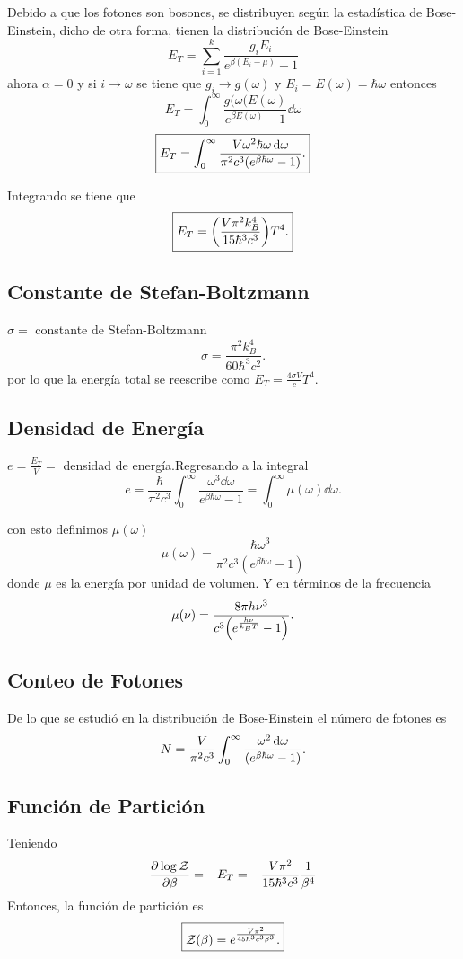 Debido a que los fotones son bosones, se distribuyen según la estadística de Bose-Einstein, dicho de otra forma, tienen la distribución de Bose-Einstein
	$$ E_T = \sum _{i=1} ^k \frac{g_i E_i}{e^{\beta (E_i - \mu)} - 1} $$
ahora $\alpha = 0$ y si $i \to \omega$ se tiene que $g_i \to g(\omega)$ y $E_i = E(\omega) = \hbar \omega$ entonces
	$$ E_T = \int _0 ^\infty \frac{g(\omega( E(\omega)}{e^{\beta E(\omega)} - 1} \dd{\omega} $$
	$$ \boxed{ E_T = \int _0 ^\infty \frac{V \omega ^2 \hbar \omega \dd{\omega}}{\pi ^2 c^3 \qty(e^{\beta \hbar \omega} - 1)}. } $$
	
Integrando se tiene que
	$$ \boxed{ E_T = \qty(\frac{V\pi^2 k_B ^4}{15 \hbar ^3 c^3}) T^4. } $$


\subsection{Constante de Stefan-Boltzmann}
$\sigma = $ constante de Stefan-Boltzmann
	$$ \sigma = \frac{\pi ^2 k_B ^4}{60 \hbar ^3 c^2}. $$
por lo que la energía total se reescribe como $E_T = \frac{4\sigma V}{c} T^4$.

\subsection{Densidad de Energía}
$e = \frac{E_T}{V} = $ densidad de energía.Regresando a la integral
	$$ e = \frac{\hbar}{\pi^2 c^3} \int _0 ^\infty \frac{\omega ^3 \dd{\omega}}{e^{\beta \hbar \omega} - 1} = \int _0 ^\infty \mu (\omega) \dd{\omega}. $$
	
con esto definimos $\mu (\omega)$
	$$ \mu (\omega) = \frac{\hbar \omega ^3 }{\pi ^2 c^3 (e^{\beta \hbar \omega} - 1)} $$
donde $\mu$ es la energía por unidad de volumen. Y en términos de la frecuencia
	$$ \mu (\nu) = \frac{8\pi h \nu ^3}{c^3 \qty(e^{\frac{h\nu}{k_B T}} - 1)}. $$


\subsection{Conteo de Fotones}
De lo que se estudió en la distribución de Bose-Einstein el número de fotones es
	$$ N = \frac{V}{\pi ^2 c^3} \int _0 ^\infty \frac{\omega ^2 \dd{\omega}}{\qty(e^{\beta \hbar \omega} - 1)}. $$



\subsection{Función de Partición}

Teniendo
	$$\pdv{\log{\mathcal{Z}}}{\beta} = - E_T = - \frac{V \pi ^2}{15 \hbar ^3 c^3} \frac{1}{\beta ^4} $$
Entonces, la función de partición es
	$$ \boxed{ \mathcal{Z} (\beta) = e^{\frac{V \pi ^2}{45 \hbar ^3 c^3 \beta ^3}} .} $$



































